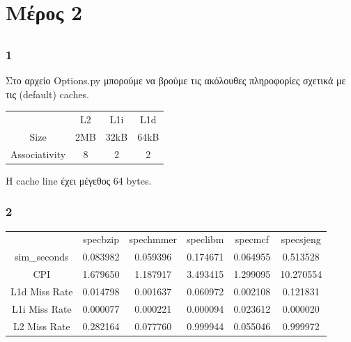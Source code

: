 \documentclass{article}
\begin{document}
\section{Μέρος 2}
\subsection{}
\subsubsection{1}
Στο αρχείο Options.py μπορούμε να βρούμε τις ακόλουθες πληροφορίες σχετικά με τις (default) caches.

\begin{center}
\begin{tabular}{|c|c|c|c|}
 \hline
  & L2 & L1i & L1d \\
 Size & 2MB & 32kB & 64kB \\
 Associativity & 8 & 2 & 2 \\
 \hline
\end{tabular}
\end{center}
Η cache line έχει μέγεθος 64 bytes.\\ 

\subsubsection{2}

\begin{center}
\begin{tabular}{|c|c|c|c|c|c|}
 \hline
   & specbzip & spechmmer & speclibm & specmcf & specsjeng\\
 sim\_seconds & 0.083982 & 0.059396 & 0.174671 & 0.064955 & 0.513528\\
 CPI & 1.679650 & 1.187917 & 3.493415 & 1.299095 & 10.270554\\
 L1d Miss Rate & 0.014798 & 0.001637 & 0.060972 & 0.002108 & 0.121831 \\
 L1i Miss Rate & 0.000077 & 0.000221 & 0.000094 & 0.023612 & 0.000020 \\
 L2 Miss Rate & 0.282164 & 0.077760 & 0.999944 & 0.055046 & 0.999972\\
 \hline
\end{tabular}
\end{center}
\end{document}
